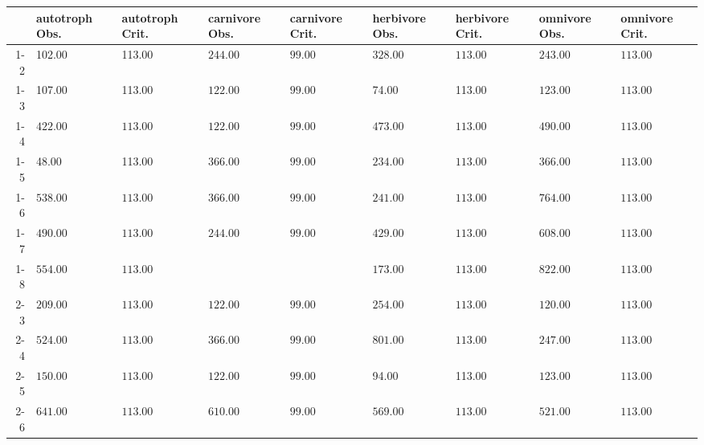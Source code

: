 \begin{table}[ht]
\centering
\begin{tabular}{rllllllll}
  \toprule
 & autotroph Obs. & autotroph Crit. & carnivore Obs. & carnivore Crit. & herbivore Obs. & herbivore Crit. & omnivore Obs. & omnivore Crit. \\ 
  \midrule
1-2 & 102.00 & 113.00 & \(\mathbf{244.00}\) & \(\mathbf{99.00}\) & \(\mathbf{328.00}\) & \(\mathbf{113.00}\) & \(\mathbf{243.00}\) & \(\mathbf{113.00}\) \\ 
  1-3 & 107.00 & 113.00 & \(\mathbf{122.00}\) & \(\mathbf{99.00}\) & 74.00 & 113.00 & \(\mathbf{123.00}\) & \(\mathbf{113.00}\) \\ 
  1-4 & \(\mathbf{422.00}\) & \(\mathbf{113.00}\) & \(\mathbf{122.00}\) & \(\mathbf{99.00}\) & \(\mathbf{473.00}\) & \(\mathbf{113.00}\) & \(\mathbf{490.00}\) & \(\mathbf{113.00}\) \\ 
  1-5 & 48.00 & 113.00 & \(\mathbf{366.00}\) & \(\mathbf{99.00}\) & \(\mathbf{234.00}\) & \(\mathbf{113.00}\) & \(\mathbf{366.00}\) & \(\mathbf{113.00}\) \\ 
  1-6 & \(\mathbf{538.00}\) & \(\mathbf{113.00}\) & \(\mathbf{366.00}\) & \(\mathbf{99.00}\) & \(\mathbf{241.00}\) & \(\mathbf{113.00}\) & \(\mathbf{764.00}\) & \(\mathbf{113.00}\) \\ 
  1-7 & \(\mathbf{490.00}\) & \(\mathbf{113.00}\) & \(\mathbf{244.00}\) & \(\mathbf{99.00}\) & \(\mathbf{429.00}\) & \(\mathbf{113.00}\) & \(\mathbf{608.00}\) & \(\mathbf{113.00}\) \\ 
  1-8 & \(\mathbf{554.00}\) & \(\mathbf{113.00}\) &  &  & \(\mathbf{173.00}\) & \(\mathbf{113.00}\) & \(\mathbf{822.00}\) & \(\mathbf{113.00}\) \\ 
  2-3 & \(\mathbf{209.00}\) & \(\mathbf{113.00}\) & \(\mathbf{122.00}\) & \(\mathbf{99.00}\) & \(\mathbf{254.00}\) & \(\mathbf{113.00}\) & \(\mathbf{120.00}\) & \(\mathbf{113.00}\) \\ 
  2-4 & \(\mathbf{524.00}\) & \(\mathbf{113.00}\) & \(\mathbf{366.00}\) & \(\mathbf{99.00}\) & \(\mathbf{801.00}\) & \(\mathbf{113.00}\) & \(\mathbf{247.00}\) & \(\mathbf{113.00}\) \\ 
  2-5 & \(\mathbf{150.00}\) & \(\mathbf{113.00}\) & \(\mathbf{122.00}\) & \(\mathbf{99.00}\) & 94.00 & 113.00 & \(\mathbf{123.00}\) & \(\mathbf{113.00}\) \\ 
  2-6 & \(\mathbf{641.00}\) & \(\mathbf{113.00}\) & \(\mathbf{610.00}\) & \(\mathbf{99.00}\) & \(\mathbf{569.00}\) & \(\mathbf{113.00}\) & \(\mathbf{521.00}\) & \(\mathbf{113.00}\) \\ 

\end{tabular}
\end{table}
